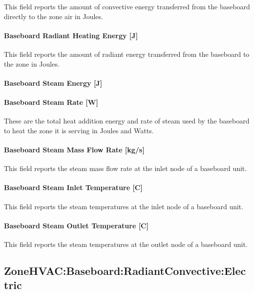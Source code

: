 This field reports the amount of convective energy transferred from the baseboard directly to the zone air in Joules.

\paragraph{Baseboard Radiant Heating Energy {[}J{]}}\label{baseboard-radiant-heating-energy-j-1}

This field reports the amount of radiant energy transferred from the baseboard to the zone in Joules.

\paragraph{Baseboard Steam Energy {[}J{]}}\label{baseboard-steam-energy-j}

\paragraph{Baseboard Steam Rate {[}W{]}}\label{baseboard-steam-rate-w}

These are the total heat addition energy and rate of steam used by the baseboard to heat the zone it is serving in Joules and Watts.

\paragraph{Baseboard Steam Mass Flow Rate {[}kg/s{]}}\label{baseboard-steam-mass-flow-rate-kgs}

This field reports the steam mass flow rate at the inlet node of a baseboard unit.

\paragraph{Baseboard Steam Inlet Temperature {[}C{]}}\label{baseboard-steam-inlet-temperature-c}

This field reports the steam temperatures at the inlet node of a baseboard unit.

\paragraph{Baseboard Steam Outlet Temperature {[}C{]}}\label{baseboard-steam-outlet-temperature-c}

This field reports the steam temperatures at the outlet node of a baseboard unit.

\subsection{ZoneHVAC:Baseboard:RadiantConvective:Electric}\label{zonehvacbaseboardradiantconvectiveelectric}

